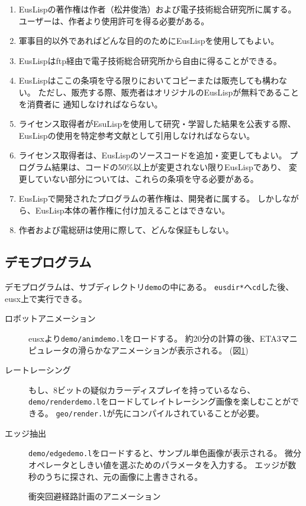 \begin{enumerate}
\item EusLispの著作権は作者（松井俊浩）および電子技術総合研究所に属する。
ユーザーは、作者より使用許可を得る必要がある。
\item 軍事目的以外であればどんな目的のためにEusLispを使用してもよい。
\item EusLispはftp経由で電子技術総合研究所から自由に得ることができる。
\item EusLispはここの条項を守る限りにおいてコピーまたは販売しても構わない。
ただし、販売する際、販売者はオリジナルのEusLispが無料であることを消費者に
通知しなければならない。
\item ライセンス取得者がEsuLispを使用して研究・学習した結果を公表する際、
EusLispの使用を特定参考文献として引用しなければならない。
\item ライセンス取得者は、EusLispのソースコードを追加・変更してもよい。
プログラム結果は、コードの50\%以上が変更されない限りEusLispであり、
変更していない部分については、これらの条項を守る必要がある。
\item EusLispで開発されたプログラムの著作権は、開発者に属する。
しかしながら、EusLisp本体の著作権に付け加えることはできない。
\item 作者および電総研は使用に際して、どんな保証もしない。
\end{enumerate}

\subsection{デモプログラム}
デモプログラムは、サブディレクトリ{\tt demo}の中にある。
{\tt *eusdir*}へ{\tt cd}した後、eusx上で実行できる。
\begin{description}
\item[ロボットアニメーション] 
eusxより{\tt demo/animdemo.l}をロードする。
約20分の計算の後、ETA3マニピュレータの滑らかなアニメーションが表示される。
(図\ref{animdemo})
\item[レートレーシング] 
もし、8ビットの疑似カラーディスプレイを持っているなら、
{\tt demo/renderdemo.l}をロードしてレイトレーシング画像を楽しむことができる。
{\tt geo/render.l}が先にコンパイルされていることが必要。
\item[エッジ抽出]
{\tt demo/edgedemo.l}をロードすると、サンプル単色画像が表示される。
微分オペレータとしきい値を選ぶためのパラメータを入力する。
エッジが数秒のうちに探され、元の画像に上書きされる。
\end{description}

\begin{figure}
\caption{\label{animdemo}衝突回避経路計画のアニメーション}
\end{figure}



\newpage


